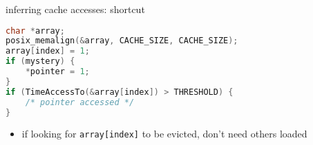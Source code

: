 \begin{frame}[fragile]{inferring cache accesses: shortcut}
\begin{lstlisting}[language=C,style=smaller]
char *array;
posix_memalign(&array, CACHE_SIZE, CACHE_SIZE);
array[index] = 1;
if (mystery) {
    *pointer = 1;
}
if (TimeAccessTo(&array[index]) > THRESHOLD) {
    /* pointer accessed */
}
\end{lstlisting}
\begin{itemize}
\item if looking for \texttt{array[index]} to be evicted, don't need others loaded
\end{itemize}
\end{frame}
